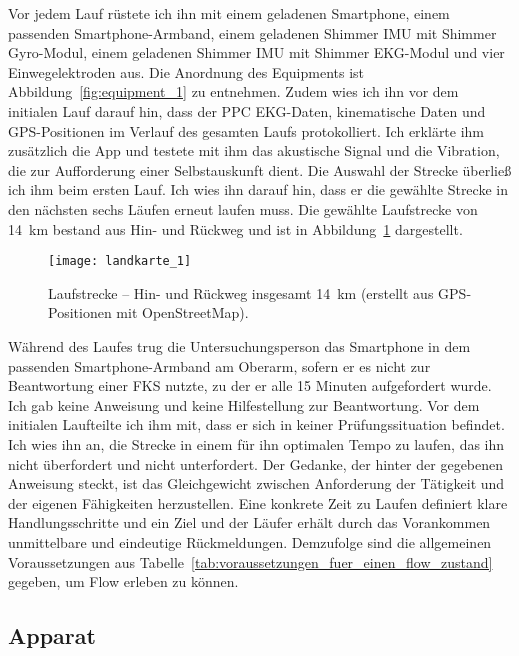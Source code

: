 Vor jedem Lauf rüstete ich ihn mit einem geladenen Smartphone, einem passenden Smartphone-Armband, einem geladenen Shimmer \ac{IMU} mit Shimmer Gyro-Modul, einem geladenen Shimmer \ac{IMU} mit Shimmer \ac{EKG}-Modul und vier Einwegelektroden aus. Die Anordnung des Equipments ist Abbildung~\ref{fig:equipment_1} zu entnehmen. Zudem wies ich ihn vor dem initialen Lauf darauf hin, dass der \ac{PPC} \ac{EKG}-Daten, kinematische Daten und \acs{GPS}-Positionen im Verlauf des gesamten Laufs protokolliert. Ich erklärte ihm zusätzlich die App und testete mit ihm das akustische Signal und die Vibration, die zur Aufforderung einer Selbstauskunft dient. Die Auswahl der Strecke überließ ich ihm beim ersten Lauf. Ich wies ihn darauf hin, dass er die gewählte Strecke in den nächsten sechs Läufen erneut laufen muss. Die gewählte Laufstrecke von 14~km bestand aus Hin- und Rückweg und ist in Abbildung~\ref{fig:landkarte_1} dargestellt. 
\begin{figure}
	[!htb] \centering 
	\texttt{[image: landkarte\_1]} \caption[Laufstrecke -- Hin- und Rückweg]{Laufstrecke -- Hin- und Rückweg insgesamt 14~km (erstellt aus \acs{GPS}-Positionen mit OpenStreetMap).} \label{fig:landkarte_1} 
\end{figure}

Während des Laufes trug die Untersuchungsperson das Smartphone in dem passenden Smartphone-Armband am Oberarm, sofern er es nicht zur Beantwortung einer \ac{FKS} nutzte, zu der er alle 15 Minuten aufgefordert wurde. Ich gab keine Anweisung und keine Hilfestellung zur Beantwortung. Vor dem initialen Laufteilte ich ihm mit, dass er sich in keiner Prüfungssituation befindet. Ich wies ihn an, die Strecke in einem für ihn optimalen Tempo zu laufen, das ihn nicht überfordert und nicht unterfordert. Der Gedanke, der hinter der gegebenen Anweisung steckt, ist das Gleichgewicht zwischen Anforderung der Tätigkeit und der eigenen Fähigkeiten herzustellen. Eine konkrete Zeit zu Laufen definiert klare Handlungsschritte und ein Ziel und der Läufer erhält durch das Vorankommen unmittelbare und eindeutige Rückmeldungen. Demzufolge sind die allgemeinen Voraussetzungen aus Tabelle~\ref{tab:voraussetzungen_fuer_einen_flow_zustand} gegeben, um Flow erleben zu können. 

\subsection{Apparat} 

\label{sub:apparat_5_1}


